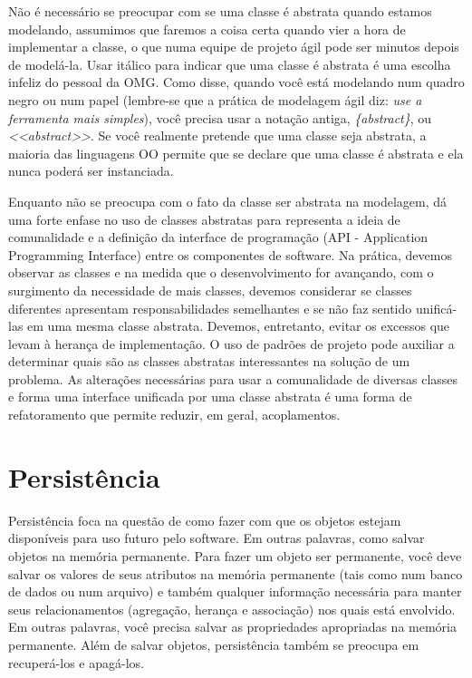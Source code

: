 Não é necessário se preocupar com se uma classe é abstrata quando estamos modelando, assumimos que faremos a coisa certa quando vier a hora de implementar a classe, o que numa equipe de projeto ágil pode ser minutos depois de modelá-la. Usar itálico para indicar que uma classe é abstrata é uma escolha infeliz do pessoal da OMG. Como \cite{uml:destilado} disse, quando você está modelando num quadro negro ou num papel (lembre-se que a prática de modelagem ágil diz: \textit{use a ferramenta mais simples}), você precisa usar a notação antiga, \emph{\{abstract\}}, ou \emph{<<abstract>>}. Se você realmente pretende que uma classe seja abstrata, a maioria das linguagens OO permite que se declare que uma classe é abstrata e ela nunca poderá ser instanciada.

Enquanto \cite{Ambler:TOP:3ed} não se preocupa com o fato da classe ser abstrata na modelagem, \cite{DP:explained} dá uma forte enfase no uso de classes abstratas para representa a ideia de comunalidade e a definição da interface de programação (API - Application Programming Interface) entre os componentes de software. Na prática, devemos observar as classes e na medida que o desenvolvimento for avançando, com o surgimento da necessidade de mais classes, devemos considerar se classes diferentes apresentam responsabilidades semelhantes e se não faz sentido unificá-las em uma mesma classe abstrata. Devemos, entretanto, evitar os excessos que levam à herança de implementação. O uso de padrões de projeto pode auxiliar a determinar quais são as classes abstratas interessantes na solução de um problema. As alterações necessárias para usar a comunalidade de diversas classes e forma uma interface unificada por uma classe abstrata é uma forma de refatoramento que permite reduzir, em geral, acoplamentos.

\section{Persistência}

Persistência foca na questão de como fazer com que os objetos estejam disponíveis para uso futuro pelo software. Em outras palavras, como salvar objetos na memória permanente. Para fazer um objeto ser permanente, você deve salvar os valores de seus atributos na memória permanente (tais como num banco de dados ou num arquivo) e também qualquer informação necessária para manter seus relacionamentos (agregação, herança e associação) nos quais está envolvido. Em outras palavras, você precisa salvar as propriedades apropriadas na memória permanente. Além de salvar objetos, persistência também se preocupa em recuperá-los e apagá-los.

